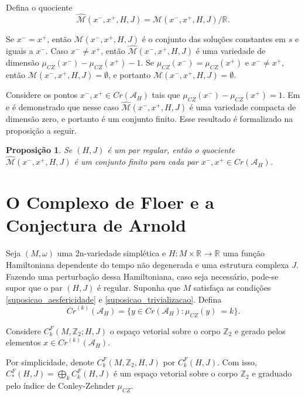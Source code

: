 \documentclass[12pt]{book}
\newtheorem{proposicao}[teorema]{Proposição}
\newcommand{\energiafinitaM}{\mathcal{M}}
\newcommand{\funcionalH}{\mathcal{A}_{H}}
\newcommand{\iconley}[1]{\iconleyabrev(#1)}
\newcommand{\iconleyabrev}{\mu_{CZ}}
\newcommand{\inteiros}{\mathbb{Z}}
\newcommand{\pontoscriticos}[1]{\textit{Cr}(#1)}
\newcommand{\pontoscriticosordem}[2]{\textit{Cr}^{(#1)}(#2)}
\newcommand{\quocientetrajetorias}{\widehat{\energiafinitaM}(x^{-}, x^{+}, H, J)}
\newcommand{\real}[1]{\mathbb{R}^{#1}}
\newcommand{\reta}{\real{}}
\begin{document}
	Defina o quociente 
	$$\quocientetrajetorias=\energiafinitaM(x^{-},x^{+}, H, J)/\reta.
	$$

	Se $x^{-}=x^{+}$, então $\energiafinitaM(x^{-},x^{+}, H, J)$ é o conjunto das soluções constantes em $s$ e iguais a $x^{-}$. Caso $x^{-}\neq x^{+}$, então $\quocientetrajetorias$ é uma variedade de dimensão $\iconley{x^{-}}-\iconley{x^{+}}-1$. Se $\iconley{x^{-}}=\iconley{x^{+}}$ e $x^{-}\neq x^{+}$, então $\energiafinitaM(x^{-},x^{+}, H, J)=\emptyset$, e portanto $\quocientetrajetorias=\emptyset$.

	Considere os pontos $x^{-}, x^{+} \in \pontoscriticos{\funcionalH}$ tais que $\iconley{x^{-}}-\iconley{x^{+}}=1$. Em \cite{audi_floer_homology} e \cite{salamon_lecture} é demonstrado que nesse caso $\quocientetrajetorias$ é uma variedade compacta de dimensão zero, e portanto é um conjunto finito. Esse resultado é formalizado na proposição a seguir.

	\begin{proposicao}\label{proposicao_quociente_orbitas_finitas}
		Se $(H,J)$ é um par regular, então o quociente $\widehat{\energiafinitaM}(x^{-},x^{+}, H, J)$ é um conjunto finito para cada par $x^{-}, x^{+} \in \pontoscriticos{\funcionalH}$.
	\end{proposicao}
	
	\section{O Complexo de Floer e a Conjectura de Arnold}\label{secao_complexo_floer}
	
	Seja $(M,\omega)$ uma 2n-variedade simplética e $H: M\times \reta\to \reta$ uma função Hamiltoniana dependente do tempo não degenerada e uma estrutura complexa $J$. Fazendo uma perturbação dessa Hamiltoniana, caso seja necessário, pode-se supor que o par $(H,J)$ é regular. Suponha que $M$ satisfaça as condições \ref{suposicao_aesfericidade} e \ref{suposicao_trivializacao}. Defina
	$$
	\pontoscriticosordem{k}{\funcionalH} = \{ y \in \pontoscriticos{\funcionalH}: \iconley{y} \ =	 k\}.
	$$
	
	Considere $C^{F}_{k}(M, \inteiros_{2}; H,J)$ o espaço vetorial sobre o corpo $\inteiros_{2}$ e gerado pelos elementos $x \in \pontoscriticosordem{k}{\funcionalH} $.
	
	Por simplicidade, denote $C^{F}_{k}(M, \inteiros_{2}, H,J)$ por $C^{F}_{k}(H,J)$. Com isso, $C^{F}_{*}(H,J)=\bigoplus_{k}C^{F}_{k}(H,J)$ é um espaço vetorial sobre o corpo $\inteiros_{2}$ e graduado pelo índice de Conley-Zehnder $\iconleyabrev$.
\end{document}
